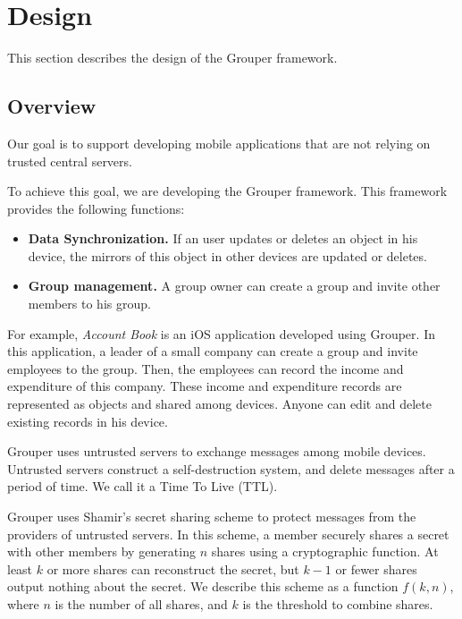 \section{Design}

This section describes the design of the Grouper framework.

\subsection{Overview}

Our goal is to support developing mobile applications that are not relying on trusted central servers.

To achieve this goal, we are developing the Grouper framework.
This framework provides the following functions:

\begin{itemize}
	\setlength{\itemsep}{1pt}
	\setlength{\parskip}{0pt}
	\setlength{\parsep}{0pt}
	\item \textbf{Data Synchronization.} 
	If an user updates or deletes an object in his device, the mirrors of this object in other devices are updated or deletes.
	\item \textbf{Group management.} 
	A group owner can create a group and invite other members to his group.
\end{itemize}

For example, \emph{Account Book} is an iOS application developed using Grouper. 
In this application, a leader of a small company can create a group and invite employees to the group. 
Then, the employees can record the income and expenditure of this company.
These income and expenditure records are represented as objects and shared among devices.
Anyone can edit and delete existing records in his device.

Grouper uses untrusted servers to exchange messages among mobile devices.
Untrusted servers construct a self-destruction system, and delete messages after a period of time.
We call it a Time To Live (TTL).

Grouper uses Shamir's secret sharing scheme to protect messages from the providers of untrusted servers.
In this scheme, a member securely shares a secret with other members by generating $n$ shares using a cryptographic function\cite{smith2013layered}. 
At least $k$ or more shares can reconstruct the secret, but $k-1$ or fewer shares output nothing about the secret\cite{pang2005new}. 
We describe this scheme as a function ${f(k, n)}$, where $n$ is the number of all shares, and $k$ is the threshold to combine shares. 


